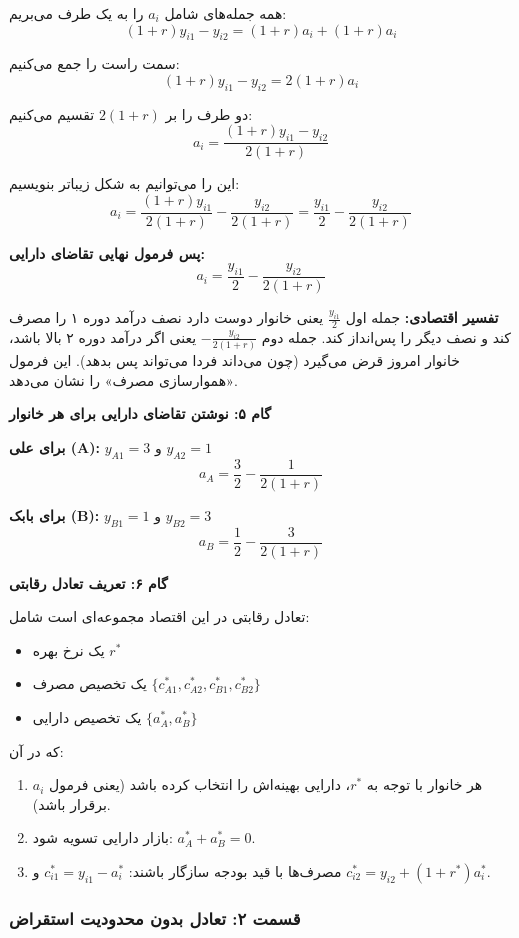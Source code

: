 \documentclass[12pt,a4paper]{article}
\begin{document}
همه جمله‌های شامل $a_i$ را به یک طرف می‌بریم:
\[
	(1+r) y_{i1} - y_{i2} = (1+r) a_i + (1+r) a_i
\]

سمت راست را جمع می‌کنیم:
\[
	(1+r) y_{i1} - y_{i2} = 2(1+r) a_i
\]

دو طرف را بر $2(1+r)$ تقسیم می‌کنیم:
\[
	a_i = \frac{(1+r) y_{i1} - y_{i2}}{2(1+r)}
\]

این را می‌توانیم به شکل زیباتر بنویسیم:
\[
	a_i = \frac{(1+r) y_{i1}}{2(1+r)} - \frac{y_{i2}}{2(1+r)} = \frac{y_{i1}}{2} - \frac{y_{i2}}{2(1+r)}
\]

\textbf{پس فرمول نهایی تقاضای دارایی:}
\[
	\boxed{a_i = \frac{y_{i1}}{2} - \frac{y_{i2}}{2(1+r)}}
\]

\textbf{تفسیر اقتصادی:} جمله اول $\frac{y_{i1}}{2}$ یعنی خانوار دوست دارد نصف درآمد دوره ۱ را مصرف کند و نصف دیگر را پس‌انداز کند. جمله دوم $-\frac{y_{i2}}{2(1+r)}$ یعنی اگر درآمد دوره ۲ بالا باشد، خانوار امروز قرض می‌گیرد (چون می‌داند فردا می‌تواند پس بدهد). این فرمول «هموارسازی مصرف» را نشان می‌دهد.

\textbf{گام ۵: نوشتن تقاضای دارایی برای هر خانوار}

\textbf{برای علی (A):} $y_{A1} = 3$ و $y_{A2} = 1$
\[
	a_A = \frac{3}{2} - \frac{1}{2(1+r)}
\]

\textbf{برای بابک (B):} $y_{B1} = 1$ و $y_{B2} = 3$
\[
	a_B = \frac{1}{2} - \frac{3}{2(1+r)}
\]

\textbf{گام ۶: تعریف تعادل رقابتی}

تعادل رقابتی در این اقتصاد مجموعه‌ای است شامل:

\begin{itemize}
	\item یک نرخ بهره $r^*$
	\item یک تخصیص مصرف $\{c_{A1}^*, c_{A2}^*, c_{B1}^*, c_{B2}^*\}$
	\item یک تخصیص دارایی $\{a_A^*, a_B^*\}$
\end{itemize}

که در آن:

\begin{enumerate}
	\item هر خانوار با توجه به $r^*$، دارایی بهینه‌اش را انتخاب کرده باشد (یعنی فرمول $a_i$ برقرار باشد).
	\item بازار دارایی تسویه شود: $a_A^* + a_B^* = 0$.
	\item مصرف‌ها با قید بودجه سازگار باشند: $c_{i1}^* = y_{i1} - a_i^*$ و $c_{i2}^* = y_{i2} + (1+r^*) a_i^*$.
\end{enumerate}

\subsubsection{قسمت ۲: تعادل بدون محدودیت استقراض}
\end{document}
